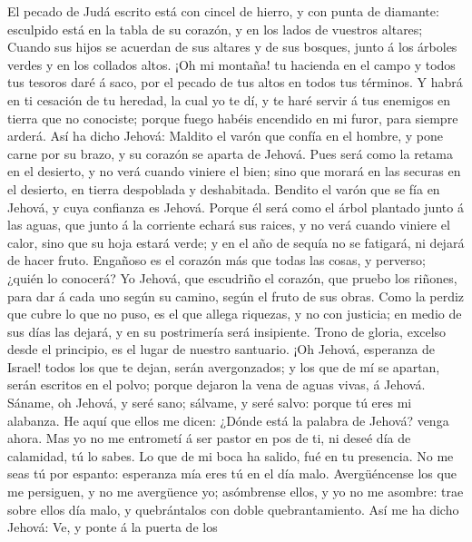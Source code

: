  El pecado de Judá escrito está con cincel de hierro, y
con punta de diamante: esculpido está en la tabla de su corazón, y en
los lados de vuestros altares;  Cuando sus hijos se
acuerdan de sus altares y de sus bosques, junto á los árboles verdes y
en los collados altos.  ¡Oh mi montaña! tu hacienda en el
campo y todos tus tesoros daré á saco, por el pecado de tus altos en
todos tus términos.  Y habrá en ti cesación de tu heredad,
la cual yo te dí, y te haré servir á tus enemigos en tierra que no
conociste; porque fuego habéis encendido en mi furor, para siempre
arderá.  Así ha dicho Jehová: Maldito el varón que confía
en el hombre, y pone carne por su brazo, y su corazón se aparta de
Jehová.  Pues será como la retama en el desierto, y no
verá cuando viniere el bien; sino que morará en las securas en el
desierto, en tierra despoblada y deshabitada.  Bendito el
varón que se fía en Jehová, y cuya confianza es Jehová. 
Porque él será como el árbol plantado junto á las aguas, que junto á la
corriente echará sus raices, y no verá cuando viniere el calor, sino que
su hoja estará verde; y en el año de sequía no se fatigará, ni dejará de
hacer fruto.  Engañoso es el corazón más que todas las
cosas, y perverso; ¿quién lo conocerá?  Yo Jehová, que
escudriño el corazón, que pruebo los riñones, para dar á cada uno según
su camino, según el fruto de sus obras.  Como la perdiz
que cubre lo que no puso, es el que allega riquezas, y no con justicia;
en medio de sus días las dejará, y en su postrimería será insipiente.
 Trono de gloria, excelso desde el principio, es el lugar
de nuestro santuario.  ¡Oh Jehová, esperanza de Israel!
todos los que te dejan, serán avergonzados; y los que de mí se apartan,
serán escritos en el polvo; porque dejaron la vena de aguas vivas, á
Jehová.  Sáname, oh Jehová, y seré sano; sálvame, y seré
salvo: porque tú eres mi alabanza.  He aquí que ellos me
dicen: ¿Dónde está la palabra de Jehová? venga ahora. 
Mas yo no me entrometí á ser pastor en pos de ti, ni deseé día de
calamidad, tú lo sabes. Lo que de mi boca ha salido, fué en tu
presencia.  No me seas tú por espanto: esperanza mía eres
tú en el día malo.  Avergüéncense los que me persiguen, y
no me avergüence yo; asómbrense ellos, y yo no me asombre: trae sobre
ellos día malo, y quebrántalos con doble quebrantamiento.
 Así me ha dicho Jehová: Ve, y ponte á la puerta de los
